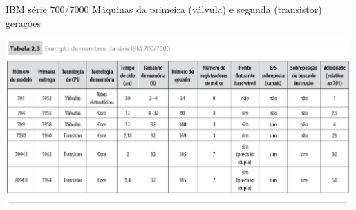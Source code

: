 \begin{slide}[toc=]{IBM série 700/7000}
Máquinas da primeira (válvula) e segunda (transistor) gerações
\begin{center}
   \includegraphics[width=0.99\textwidth]{figs/ibm700} 
\end{center}
\end{slide}

